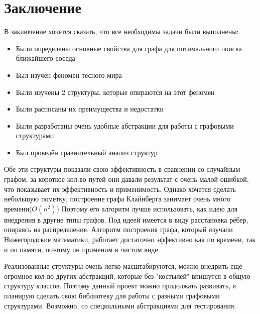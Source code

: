 \section{Заключение}

В заключение хочется сказать, что все необходимы задачи были выполнены:
\begin{itemize}
    \item Были определены основные свойства для графа для оптимального поиска ближай\-шего соседа
    \item Был изучен феномен тесного мира
    \item Были изучены 2 структуры, которые опираются на этот феномен
    \item Были расписаны их преимущества и недостатки
    \item Были разработаны очень удобные абстракции для работы с графовыми структурами
    \item Был проведён сравнительный анализ структур
\end{itemize}

Обе эти структуры показали свою эффективность в сравнении со случайным графом, за короткое 
кол-во путей они давали результат с очень малой ошибкой, что показывает их эффективность
и применимость. Однако хочется сделать небольшую пометку, построение графа Клайнберга занимает очень
много времени($O(n^2)$) Поэтому его алгоритм лучше использовать, как идею для внедрения в другие типы графов. 
Под идеей имеется в виду расстановка рёбер, опираясь на распределение. Алгоритм построения графа,
который изучали Нижегородские математики, работает достаточно эффективно как по времени, так и по памяти,
поэтому он применим в чистом виде. 

Реализованные структуры очень легко масштабируются, можно внедрить ещё огромное кол-во других абстракций, которые
без "костылей" впишутся в общую структуру классов. Поэтому данный проект можно продолжать развивать,
я планирую сделать свою библиотеку для работы с разными графовыми структурами. Возможно, со
специальными абстракциями для тестирования.